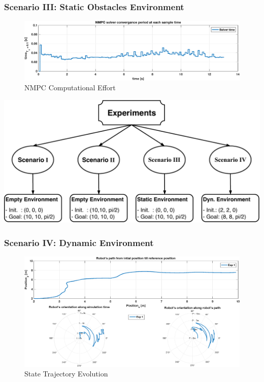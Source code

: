  	\begin{frame}
 		\frametitle{Scenario \textrm{III}: Static Obstacles Environment}
 		\begin{figure}[hbtp]
 			\centering
 			\includegraphics[scale=0.42]{pictures/graphs/sn2_solver_time.eps}
 			\caption{NMPC Computational Effort}
 		\end{figure}
 	\end{frame}
 
	\begin{frame}
		\centering
		\includegraphics[scale=0.7]{pictures/eperiments.pdf}
	\end{frame}
 
	\begin{frame}
		\frametitle{Scenario \textrm{IV}: Dynamic Environment}
		\begin{figure}[hbtp]
			\centering
			\includegraphics[scale=0.44]{pictures/graphs/sn3_states_1.eps}
			\caption{State Trajectory Evolution}
		\end{figure}
	\end{frame}
	
